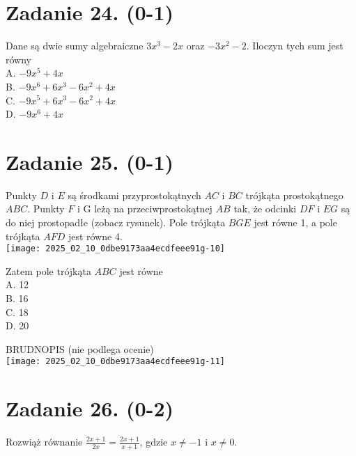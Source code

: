 \documentclass[10pt]{article}
\begin{document}
\section*{Zadanie 24. (0-1)}
Dane są dwie sumy algebraiczne \(3 x^{3}-2 x\) oraz \(-3 x^{2}-2\). Iloczyn tych sum jest równy\\
A. \(-9 x^{5}+4 x\)\\
B. \(-9 x^{6}+6 x^{3}-6 x^{2}+4 x\)\\
C. \(-9 x^{5}+6 x^{3}-6 x^{2}+4 x\)\\
D. \(-9 x^{6}+4 x\)

\section*{Zadanie 25. (0-1)}
Punkty \(D\) i \(E\) są środkami przyprostokątnych \(A C\) i \(B C\) trójkąta prostokątnego \(A B C\). Punkty \(F\) i G leżą na przeciwprostokątnej \(A B\) tak, że odcinki \(D F\) i \(E G\) są do niej prostopadłe (zobacz rysunek). Pole trójkąta \(B G E\) jest równe 1, a pole trójkąta \(A F D\) jest równe 4.\\
\texttt{[image: 2025\_02\_10\_0dbe9173aa4ecdfeee91g-10]}

Zatem pole trójkąta \(A B C\) jest równe\\
A. 12\\
B. 16\\
C. 18\\
D. 20

BRUDNOPIS (nie podlega ocenie)\\
\texttt{[image: 2025\_02\_10\_0dbe9173aa4ecdfeee91g-11]}

\section*{Zadanie 26. (0-2)}
Rozwiąż równanie \(\frac{2 x+1}{2 x}=\frac{2 x+1}{x+1}\), gdzie \(x \neq-1\) i \(x \neq 0\).
\end{document}
